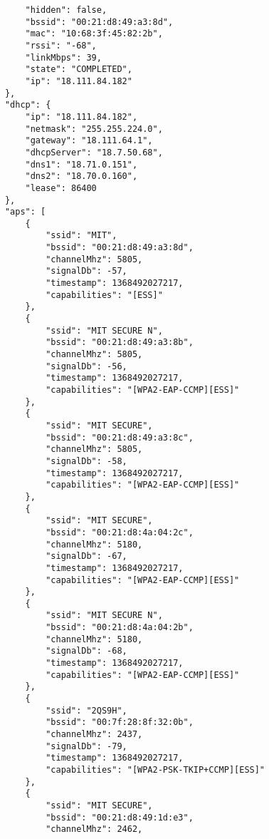 \begin{verbatim}
                "hidden": false,
                "bssid": "00:21:d8:49:a3:8d",
                "mac": "10:68:3f:45:82:2b",
                "rssi": "-68",
                "linkMbps": 39,
                "state": "COMPLETED",
                "ip": "18.111.84.182"
            },
            "dhcp": {
                "ip": "18.111.84.182",
                "netmask": "255.255.224.0",
                "gateway": "18.111.64.1",
                "dhcpServer": "18.7.50.68",
                "dns1": "18.71.0.151",
                "dns2": "18.70.0.160",
                "lease": 86400
            },
            "aps": [
                {
                    "ssid": "MIT",
                    "bssid": "00:21:d8:49:a3:8d",
                    "channelMhz": 5805,
                    "signalDb": -57,
                    "timestamp": 1368492027217,
                    "capabilities": "[ESS]"
                },
                {
                    "ssid": "MIT SECURE N",
                    "bssid": "00:21:d8:49:a3:8b",
                    "channelMhz": 5805,
                    "signalDb": -56,
                    "timestamp": 1368492027217,
                    "capabilities": "[WPA2-EAP-CCMP][ESS]"
                },
                {
                    "ssid": "MIT SECURE",
                    "bssid": "00:21:d8:49:a3:8c",
                    "channelMhz": 5805,
                    "signalDb": -58,
                    "timestamp": 1368492027217,
                    "capabilities": "[WPA2-EAP-CCMP][ESS]"
                },
                {
                    "ssid": "MIT SECURE",
                    "bssid": "00:21:d8:4a:04:2c",
                    "channelMhz": 5180,
                    "signalDb": -67,
                    "timestamp": 1368492027217,
                    "capabilities": "[WPA2-EAP-CCMP][ESS]"
                },
                {
                    "ssid": "MIT SECURE N",
                    "bssid": "00:21:d8:4a:04:2b",
                    "channelMhz": 5180,
                    "signalDb": -68,
                    "timestamp": 1368492027217,
                    "capabilities": "[WPA2-EAP-CCMP][ESS]"
                },
                {
                    "ssid": "2QS9H",
                    "bssid": "00:7f:28:8f:32:0b",
                    "channelMhz": 2437,
                    "signalDb": -79,
                    "timestamp": 1368492027217,
                    "capabilities": "[WPA2-PSK-TKIP+CCMP][ESS]"
                },
                {
                    "ssid": "MIT SECURE",
                    "bssid": "00:21:d8:49:1d:e3",
                    "channelMhz": 2462,

\end{verbatim}
